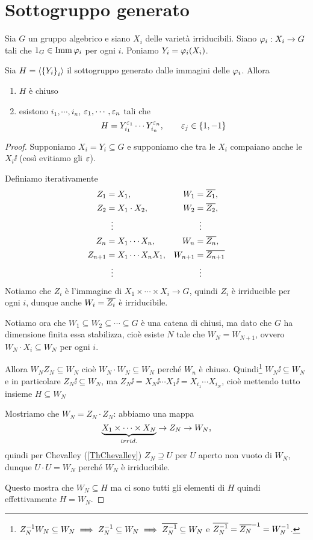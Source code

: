 \section{Sottogruppo generato}
\begin{lemma}
Sia $G$ un gruppo algebrico e siano $X_i$ delle variet\`a irriducibili. Siano $\varphi_i:X_i\to G$ tali che $1_G\in \operatorname{Imm}\varphi_i$ per ogni $i$. Poniamo $Y_i=\varphi_i(X_i)$.

Sia $H=\left\langle {\left\{{Y_i}\right\}_i}\right\rangle$ il sottogruppo generato dalle immagini delle $\varphi_i$. Allora

\begin{enumerate}
	\item $H$ \`e chiuso
	\item esistono $i_1,\cdots, i_n$, $\varepsilon_1,\cdots, \varepsilon_n$ tali che
	\[H=Y_{i_1}^{\varepsilon_1}\cdots Y_{i_n}^{\varepsilon_n},\qquad \varepsilon_j\in\left\{{1,-1}\right\}\]
\end{enumerate}
\end{lemma}
\begin{proof}
Supponiamo $X_i=Y_i\subseteq G$ e supponiamo che tra le $X_i$ compaiano anche le $X_i\ii$ (cos\`i evitiamo gli $\varepsilon$).

Definiamo iterativamente
\begin{align*}
	Z_1&=X_1, &W_1&=\overline{Z_1},\\
	Z_2&=X_1\cdot X_2, &W_2&=\overline{Z_2},\\ 
	&\;\;\vdots &&\;\;\vdots\\	
	Z_n&=X_1\cdots X_n, &W_n&=\overline{Z_n},\\
	Z_{n+1}&=X_1\cdots X_nX_1, &W_{n+1}&=\overline{Z_{n+1}}\\
	&\;\;\vdots &&\;\;\vdots
\end{align*}
Notiamo che $Z_i$ \`e l'immagine di $X_1\times\cdots\times X_i\to G$, quindi $Z_i$ \`e irriducible per ogni $i$, dunque anche $W_i=\overline{Z_i}$ \`e irriducibile.

Notiamo ora che $W_1\subseteq W_2\subseteq\cdots\subseteq G$ \`e una catena di chiusi, ma dato che $G$ ha dimensione finita essa stabilizza, cio\`e esiste $N$ tale che $W_N=W_{N+1}$, ovvero $W_N\cdot X_i\subseteq W_N$ per ogni $i$.

Allora $W_NZ_N\subseteq W_N$ cio\`e $W_N\cdot W_N\subseteq W_N$ perch\'e $W_n$ \`e chiuso. Quindi\footnote{$Z_N^{-1} W_N\subseteq W_N\implies Z_N^{-1}\subseteq W_N\implies \overline{Z_N^{-1}}\subseteq W_N$ e $\overline{Z_N^{-1}}=\overline{Z_N}^{-1}=W_N^{-1}$.} $W_N\ii\subseteq W_N$ e in particolare $Z_N\ii\subseteq W_N$, ma $Z_N\ii=X_N\ii\cdots X_1\ii=X_{i_1}\cdots X_{i_N}$, cio\`e mettendo tutto insieme $H\subseteq W_N$

Mostriamo che $W_N=Z_N\cdot Z_N$: abbiamo una mappa
\[\underset{irrid.}{\underbrace{X_1\times\cdots\times X_N}}\to Z_N\to W_N,\]
quindi per Chevalley (\ref{ThChevalley}) $Z_N\supseteq U$ per $U$ aperto non vuoto di $W_N$, dunque $U\cdot U=W_N$ perch\'e $W_N$ \`e irriducibile.

Questo mostra che $W_N\subseteq H$ ma ci sono tutti gli elementi di $H$ quindi effettivamente $H=W_N$.
\end{proof}


